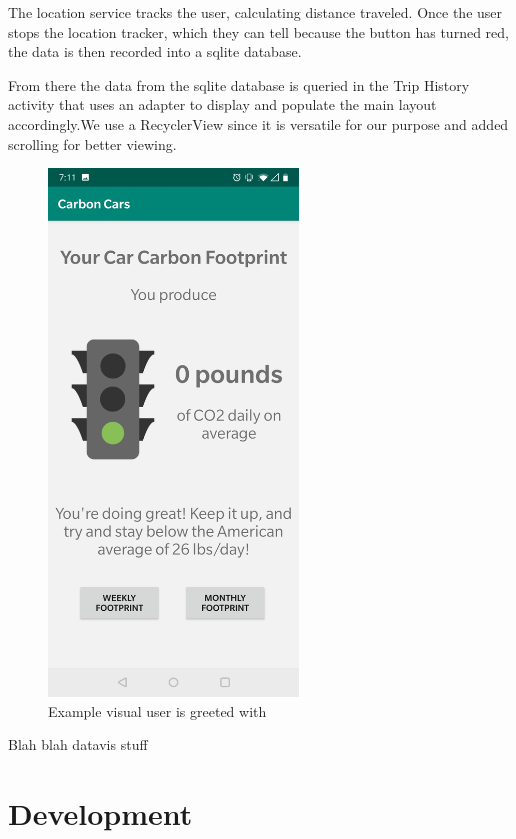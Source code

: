 \documentclass[twoside,twocolumn]{article}
\begin{document}
The location service tracks the user, calculating distance traveled. Once the user stops the location tracker, which they can tell because the button has turned red, the data is then recorded into a sqlite database. 

From there the data from the sqlite database is queried in the Trip History activity that uses an adapter to display and populate the main layout accordingly.We use a RecyclerView since it is versatile for our purpose and added scrolling for better viewing.

\begin{figure}[h!]
  \includegraphics[width=\linewidth,height=14cm,keepaspectratio]{datavis.jpg}
  \caption{Example visual user is greeted with}
\end{figure}
Blah blah datavis stuff

\newpage
\section{Development}
\end{document}

